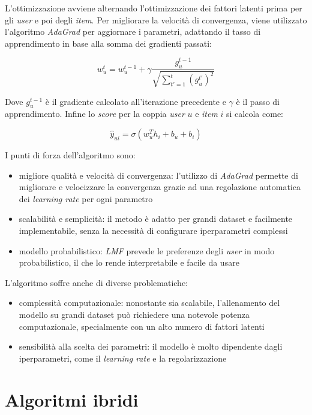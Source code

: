 L'ottimizzazione avviene alternando l'ottimizzazione dei fattori latenti prima per gli \textit{user} e poi degli \textit{item}. Per migliorare la velocità di convergenza, viene utilizzato l'algoritmo \textit{AdaGrad} per aggiornare i parametri, adattando il tasso di apprendimento in base alla somma dei gradienti passati:

\[
w_u^t = w_u^{t-1} + \gamma \frac{g_u^{t-1}}{\sqrt{\sum_{t'=1}^t (g_u^{t'})^2}}
\]


Dove $g_u^{t-1}$ è il gradiente calcolato all'iterazione precedente e $\gamma$ è il passo di apprendimento. Infine lo \textit{score} per la coppia \textit{user} $u$ e \textit{item} $i$ si calcola come:

\[
\hat{y}_{ui} = \sigma(w_u^T h_i + b_u + b_i)
\]

I punti di forza dell'algoritmo sono:

\begin{itemize}
    \item migliore qualità e velocità di convergenza: l'utilizzo di \textit{AdaGrad} permette di migliorare e velocizzare la convergenza grazie ad una regolazione automatica dei \textit{learning rate} per ogni parametro
    \item scalabilità e semplicità: il metodo è adatto per grandi dataset e facilmente implementabile, senza la necessità di configurare iperparametri complessi
    \item modello probabilistico: \textit{LMF} prevede le preferenze degli \textit{user} in modo probabilistico, il che lo rende interpretabile e facile da usare
\end{itemize}

L'algoritmo soffre anche di diverse problematiche:

\begin{itemize}
    \item complessità computazionale: nonostante sia scalabile, l'allenamento del modello su grandi dataset può richiedere una notevole potenza computazionale, specialmente con un alto numero di fattori latenti
    \item sensibilità alla scelta dei parametri: il modello è molto dipendente dagli iperparametri, come il \textit{learning rate} e la regolarizzazione
\end{itemize}

\section{Algoritmi ibridi}

